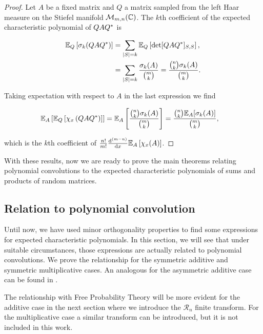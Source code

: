 \begin{proof}
    Let $A$ be a fixed matrix and $Q$ a matrix sampled from the left Haar measure on the Stiefel manifold $\mathcal M_{m,n}(\mathbb C)$. The $k$th coefficient of the expected characteristic polynomial of $QAQ^*$ is 

    \begin{align*}
        \mathbb E_Q \left[ \sigma_k(QAQ^*) \right] &= \sum_{\lvert S \rvert = k} \mathbb E_Q\left[ \det [QAQ^*]_{S,S} \right],\\ 
        &= \sum_{\lvert S \rvert = k} \frac{\sigma_k(A)}{\binom mk} = \frac{\binom{n}{k} \sigma_k(A)}{\binom{m}{k}}.
    \end{align*}

    Taking expectation with respect to $A$ in the last expression we find

    \begin{align*}
        \mathbb E_A \left[\mathbb E_Q\left[ \chi_x \left( Q A Q^* \right) \right]\right] &= \mathbb E_A \left[ \frac{\binom{n}{k} \sigma_k(A)}{\binom{m}{k}} \right] = \frac{\binom{n}{k} \mathbb E_A[\sigma_k(A)]}{\binom{m}{k}},
    \end{align*}

    \noindent which is the $k$th coefficient of $\frac{n!}{m!} \frac{\mathrm d^{(m-n)}}{\mathrm d x} \mathbb E_A \left[\chi_x(A) \right]$.
\end{proof}

With these results, now we are ready to prove the main theorems relating polynomial convolutions to the expected characteristic polynomials of sums and products of random matrices.

\subsection{Relation to polynomial convolution}

Until now, we have used minor orthogonality properties to find some expressions for expected characteristic polynomials. In this section, we will see that under suitable circumstances, those expressions are actually related to polynomial convolutions. We prove the relationship for the symmetric additive and symmetric multiplicative cases. An analogous for the asymmetric additive case can be found in \cite{article:finitefree}. %

The relationship with Free Probability Theory will be more evident for the additive case in the next section where we introduce the $\mathcal R_n$ finite transform. For the multiplicative case a similar transform can be introduced, but it is not included in this work. 

